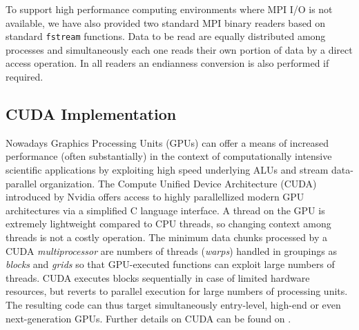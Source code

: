 \documentclass[1p,times]{elsarticle}
\begin{document}
To support high performance computing environments where MPI I/O is not available, 
we have also provided two standard MPI binary readers based on standard {\tt fstream} functions.
Data to be read are equally distributed among processes and simultaneously each one reads
their own portion of data by a direct access operation. 
%
In all readers an endianness conversion is also performed if required.



\subsection{CUDA Implementation}
\label{cuda}
Nowadays Graphics Processing Units (GPUs) can offer a means of increased performance 
(often substantially) in the context of computationally intensive scientific applications by exploiting high speed underlying ALUs and stream data-parallel organization. 
The Compute Unified Device Architecture (CUDA) introduced by Nvidia offers access to highly parallellized modern GPU architectures via a 
simplified C language interface. 
A thread on the GPU is extremely lightweight compared to CPU threads, so changing context among threads is not a costly operation. The minimum 
data chunks processed by a CUDA {\it multiprocessor} are numbers of threads ({\it warps}) handled in groupings as {\it blocks} and {\it grids} so that GPU-executed functions can exploit large numbers of threads. CUDA executes blocks sequentially
in case of limited hardware resources, but reverts to parallel execution for large numbers 
of processing units.  The resulting code can thus target simultaneously entry-level, high-end or even next-generation GPUs. Further details on CUDA can be found on \cite{cudaprogguide}.

\end{document}
